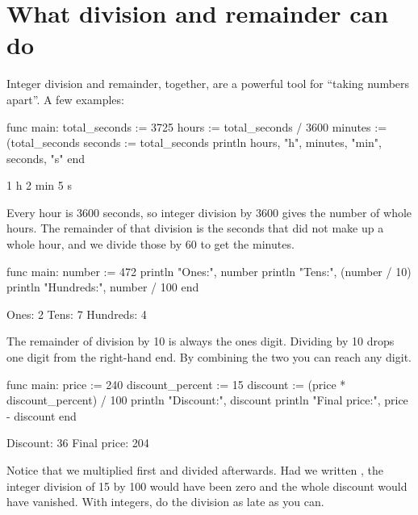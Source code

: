\section{What division and remainder can do}

Integer division and remainder, together, are a powerful tool for ``taking
numbers apart''. A few examples:

\begin{salamcode}
func main:
    total_seconds := 3725
    hours := total_seconds / 3600
    minutes := (total_seconds %
    seconds := total_seconds %
    println hours, "h", minutes, "min", seconds, "s"
end
\end{salamcode}

\begin{salamout}
1 h 2 min 5 s
\end{salamout}

Every hour is 3600 seconds, so integer division by 3600 gives the number of
whole hours. The remainder of that division is the seconds that did not make
up a whole hour, and we divide those by 60 to get the minutes.

\begin{salamcode}
func main:
    number := 472
    println "Ones:", number %
    println "Tens:", (number / 10) %
    println "Hundreds:", number / 100
end
\end{salamcode}

\begin{salamout}
Ones: 2
Tens: 7
Hundreds: 4
\end{salamout}

The remainder of division by 10 is always the ones digit. Dividing by 10
drops one digit from the right-hand end. By combining the two you can reach
any digit.

\begin{salamcode}
func main:
    price := 240
    discount_percent := 15
    discount := (price * discount_percent) / 100
    println "Discount:", discount
    println "Final price:", price - discount
end
\end{salamcode}

\begin{salamout}
Discount: 36
Final price: 204
\end{salamout}

Notice that we multiplied first and divided afterwards. Had we written
, the integer division of 15 by 100
would have been zero and the whole discount would have vanished. With
integers, do the division as late as you can.

